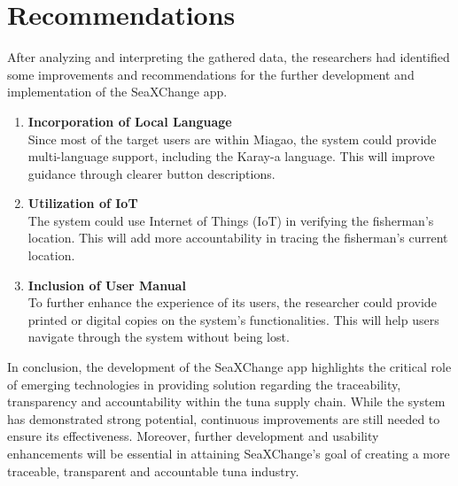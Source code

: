 \section{Recommendations}
After analyzing and interpreting the gathered data, the researchers had identified some improvements and recommendations for the further development and implementation of the SeaXChange app.
\begin{enumerate}
	\item \textbf{Incorporation of Local Language}
	\\Since most of the target users are within Miagao, the system could provide multi-language support, including the Karay-a language. This will improve guidance through clearer button descriptions.
	
	\item \textbf{Utilization of IoT}
	\\The system could use Internet of Things (IoT) in verifying the fisherman's location. This will add more accountability in tracing the fisherman's current location.
	
	\item \textbf{Inclusion of User Manual }
	\\To further enhance the experience of its users, the researcher could provide printed or digital copies on the system's functionalities. This will help users navigate through the system without being lost.
\end{enumerate}


\noindent In conclusion, the development of the SeaXChange app highlights the critical role of emerging technologies in providing solution regarding the traceability, transparency and accountability within the tuna supply chain. While the system has demonstrated strong potential, continuous improvements are still needed to ensure its effectiveness. Moreover, further development and usability enhancements will be essential in attaining SeaXChange's goal of creating a more traceable, transparent and accountable tuna industry.
